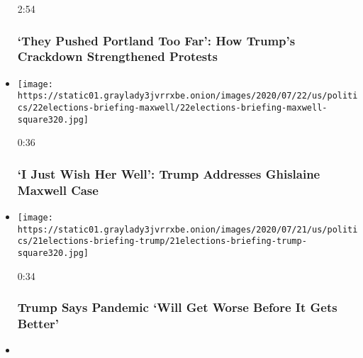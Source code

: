 \begin{itemize}
  2:54

  \hypertarget{they-pushed-portland-too-far-how-trumps-crackdown-strengthened-protests}{%
  \subsubsection{`They Pushed Portland Too Far': How Trump's Crackdown
  Strengthened
  Protests}\label{they-pushed-portland-too-far-how-trumps-crackdown-strengthened-protests}}
\item
  \href{https://www.nytimes3xbfgragh.onion/video/us/politics/100000007251195/trump-ghislaine-maxwell.html?action=click\&module=video-series-bar\&region=header\&pgtype=Article\&playlistId=video/u-s}{}

  \texttt{[image: https://static01.graylady3jvrrxbe.onion/images/2020/07/22/us/politics/22elections-briefing-maxwell/22elections-briefing-maxwell-square320.jpg]}

  0:36

  \hypertarget{i-just-wish-her-well-trump-addresses-ghislaine-maxwell-case}{%
  \subsubsection{`I Just Wish Her Well': Trump Addresses Ghislaine
  Maxwell
  Case}\label{i-just-wish-her-well-trump-addresses-ghislaine-maxwell-case}}
\item
  \href{https://www.nytimes3xbfgragh.onion/video/us/100000007250068/trump-says-virus-worse-before-better.html?action=click\&module=video-series-bar\&region=header\&pgtype=Article\&playlistId=video/u-s}{}

  \texttt{[image: https://static01.graylady3jvrrxbe.onion/images/2020/07/21/us/politics/21elections-briefing-trump/21elections-briefing-trump-square320.jpg]}

  0:34

  \hypertarget{trump-says-pandemic-will-get-worse-before-it-gets-better}{%
  \subsubsection{Trump Says Pandemic `Will Get Worse Before It Gets
  Better'}\label{trump-says-pandemic-will-get-worse-before-it-gets-better}}
\item
  \href{https://www.nytimes3xbfgragh.onion/video/us/100000007248945/portland-protests-federal-agents.html?action=click\&module=video-series-bar\&region=header\&pgtype=Article\&playlistId=video/u-s}{}


\end{itemize}
